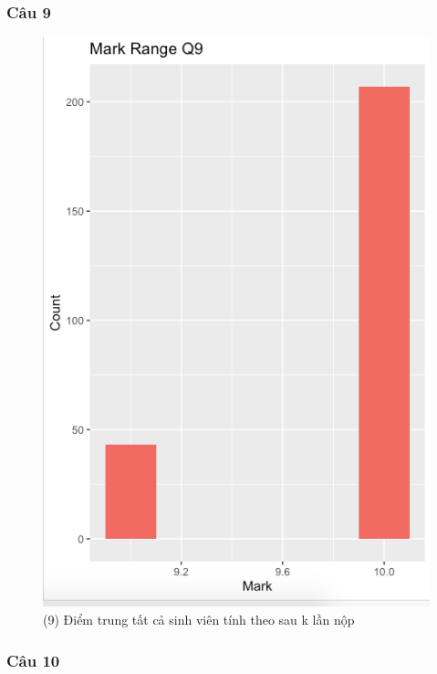 \documentclass[a4paper]{article}
\theoremstyle{definition}
\begin{document}
\subsubsection{Câu 9}
\begin{figure}[!ht]
    \centering
    \includegraphics[scale=0.4]{Pics/q9-plot2.png}
    \caption{(9) Điểm trung tất cả sinh viên tính theo sau k lần nộp}
    \label{fig:my_label}
\end{figure}
\subsubsection{Câu 10}
\newpage
\end{document}
